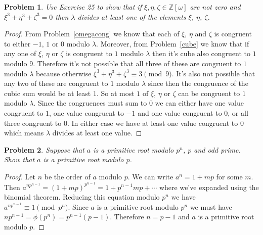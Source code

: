 \documentclass{article}
\newtheorem{problem}{Problem}
\begin{document}
\begin{problem}
Use Exercise 25 to show that if $\xi, \eta, \zeta \in \mathbb{Z}[\omega]$ are not zero and $\xi^3 + \eta^3 + \zeta^3 = 0$ then $\lambda$ divides at least one of the elements $\xi$, $\eta$, $\zeta$.
\end{problem}
\begin{proof}
From Problem~\ref{omegacong} we know that each of $\xi$, $\eta$ and $\zeta$ is congruent to either $-1$, $1$ or $0$ modulo $\lambda$. Moreover, from Problem~\ref{cube} we know that if any one of $\xi$, $\eta$ or $\zeta$ is congruent to $1$ modulo $\lambda$ then it's cube also congruent to $1$ modulo $9$. Therefore it's not possible that all three of these are congruent to $1$ modulo $\lambda$ because otherwise $\xi^3 + \eta^3 + \zeta^3 \equiv 3 \pmod{9}$. It's also not possible that any two of these are congruent to $1$ modulo $\lambda$ since then the congruence of the cubic sum would be at least $1$. So at most $1$ of $\xi$, $\eta$ or $\zeta$ can be congruent to $1$ modulo $\lambda$. Since the congruences must sum to $0$ we can either have one value congruent to $1$, one value congruent to $-1$ and one value congruent to $0$, or all three congruent to $0$. In either case we have at least one value congruent to $0$ which means $\lambda$ divides at least one value.
\end{proof}

\begin{problem}
Suppose that $a$ is a primitive root modulo $p^n$, $p$ and odd prime. Show that $a$ is a primitive root modulo $p$.
\end{problem}
\begin{proof}
Let $n$ be the order of $a$ modulo $p$. We can write $a^n = 1 + mp$ for some $m$. Then $a^{np^{n-1}} = (1 + mp)^{p^{n-1}} = 1 + p^{n-1}mp + \cdots$ where we've expanded using the binomial theorem. Reducing this equation modulo $p^n$ we have $a^{np^{n-1}} \equiv 1 \pmod{p^n}$. Since $a$ is a primitive root modulo $p^n$ we must have $np^{n-1} = \phi(p^n) = p^{n-1}(p-1)$. Therefore $n = p-1$ and $a$ is a primitive root modulo $p$.
\end{proof}
\end{document}
